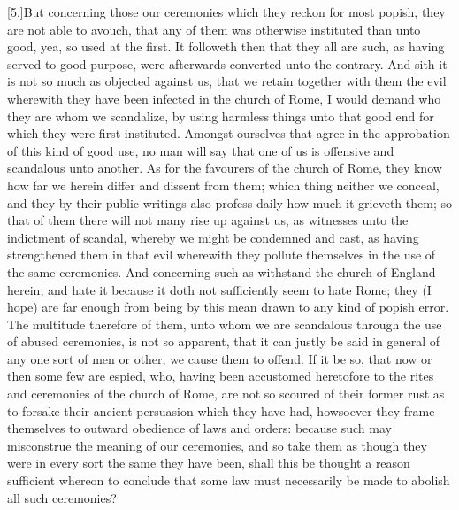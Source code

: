 [5.]But concerning those our ceremonies which they reckon for most popish, they are not able to avouch, that any of them was otherwise instituted than unto good, yea, so used at the first. It followeth then that they all are such, as having served to good purpose, were afterwards converted unto the contrary. And sith it is not so much as objected against us, that we retain together with them the evil wherewith they have been infected in the church of Rome, I would demand who they are whom we scandalize, by using harmless things unto that good end for which they were first instituted. Amongst ourselves that agree in the approbation of this kind of good use, no man will say that one of us is offensive and scandalous unto another. As for the favourers of the church of Rome, they know how far we herein differ and dissent from them; which thing neither we conceal, and they by their public writings also profess daily how much it grieveth them; so that of them there will not many rise up against us, as witnesses unto the indictment of scandal, whereby we might be condemned and cast, as having strengthened them in that evil wherewith they pollute themselves in the use of the same ceremonies. And concerning such as withstand the church of England herein, and hate it because it doth not sufficiently seem to hate Rome; they (I hope) are far enough from being by this mean drawn to any kind of popish error. The multitude therefore of them, unto whom we are scandalous through the use of abused ceremonies, is not so apparent, that it can justly be said in general of any one sort of men or other, we cause them to offend. If it be so, that now or then some few are espied, who, having been accustomed heretofore to the rites and ceremonies of the church of Rome, are not so scoured of their former rust as to forsake their ancient persuasion which they have had, howsoever they frame themselves to  outward obedience of laws and orders: because such may misconstrue the meaning of our ceremonies, and so take them as though they were in every sort the same they have been, shall this be thought a reason sufficient whereon to conclude that some law must necessarily be made to abolish all such ceremonies?

